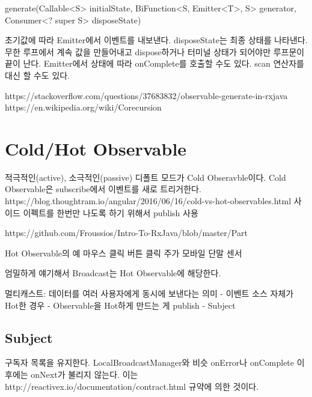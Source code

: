 \documentclass{book}
\begin{document}
generate(Callable<S> initialState, BiFunction<S, Emitter<T>, S> generator,
            Consumer<? super S> disposeState) {

초기값에 따라 Emitter에서 이벤트를 내보낸다.            
disposeState는 최종 상태를 나타낸다.
무한 루프에서 계속 값을 만들어내고 dispose하거나 터미널 상태가 되어야만 루프문이 끝이 난다.
Emitter에서 상태에 따라 onComplete를 호출할 수도 있다.
scan 연산자를 대신 할 수도 있다.

https://stackoverflow.com/questions/37683832/observable-generate-in-rxjava
https://en.wikipedia.org/wiki/Corecursion


\section{Cold/Hot Observable} 
적극적인(active), 소극적인(passive)
디폴트 모드가 Cold Obseravble이다.
Cold Observable은 subscribe에서 이벤트를 새로 트리거한다.
https://blog.thoughtram.io/angular/2016/06/16/cold-vs-hot-observables.html
사이드 이펙트를 한번만 나도록 하기 위해서 publish 사용


https://github.com/Froussios/Intro-To-RxJava/blob/master/Part%

Hot Observable의 예
마우스 클릭
버튼 클릭
주가
모바일 단말 센서

엄밀하게 얘기해서 Broadcast는 Hot Observable에 해당한다. 

멀티캐스트: 데이터를 여러 사용자에게 동시에 보낸다는 의미
- 이벤트 소스 자체가 Hot한 경우
- Observable을 Hot하게 만드는 게 publish
- Subject


\subsection{Subject}
구독자 목록을 유지한다. LocalBroadcastManager와 비슷
onError나 onComplete 이후에는 onNext가 불리지 않는다.
이는 http://reactivex.io/documentation/contract.html 규약에 의한 것이다.

}
\end{document}
